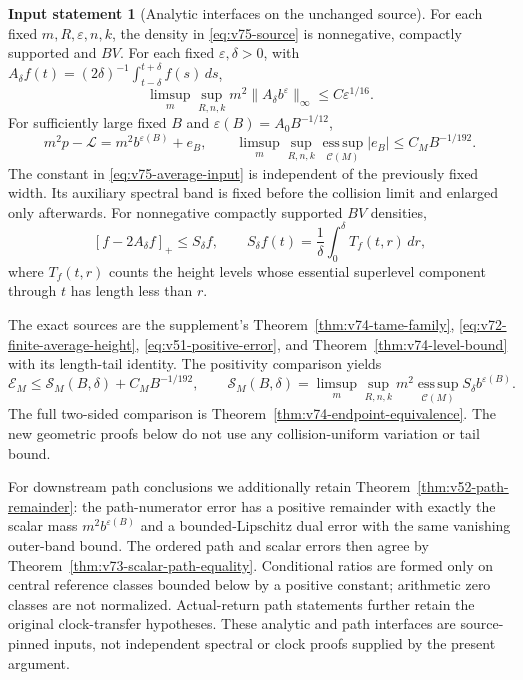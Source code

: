 \documentclass[11pt,reqno]{amsart}
\numberwithin{equation}{section}
\theoremstyle{definition}
\newtheorem{inputstatement}[theorem]{Input statement}
\theoremstyle{remark}\newtheorem{remark}[theorem]{Remark}
\newcommand{\esssup}{\operatorname*{ess\,sup}}
\begin{document}
\begin{inputstatement}[Analytic interfaces on the unchanged source]
\label{input:v75-analytic}
For each fixed $m,R,\varepsilon,n,k$, the density in
\eqref{eq:v75-source} is nonnegative, compactly supported and $BV$.
For each fixed $\varepsilon,\delta>0$, with
$A_\delta f(t)=(2\delta)^{-1}\int_{t-\delta}^{t+\delta}f(s)\,ds$,
\begin{equation}\label{eq:v75-average-input}
 \limsup_m\sup_{R,n,k}m^2\|A_\delta b^\varepsilon\|_\infty
                                  \le C\varepsilon^{1/16}.
\end{equation}
For sufficiently large fixed $B$ and $\varepsilon(B)=A_0B^{-1/12}$,
\begin{equation}\label{eq:v75-positive-input}
 m^2p-\mathcal L=m^2b^{\varepsilon(B)}+e_B,\qquad
 \limsup_m\sup_{R,n,k}\esssup_{\mathcal C(M)}|e_B|
                                  \le C_MB^{-1/192}.
\end{equation}
The constant in \eqref{eq:v75-average-input} is independent of the
previously fixed width. Its auxiliary spectral band is fixed before
the collision limit and enlarged only afterwards. For nonnegative
compactly supported $BV$ densities,
\[
 [f-2A_\delta f]_+\le S_\delta f,\qquad
 S_\delta f(t)=\frac1\delta\int_0^\delta T_f(t,r)\,dr,
\]
where $T_f(t,r)$ counts the height levels whose essential superlevel
component through $t$ has length less than $r$.
\end{inputstatement}

The exact sources are the supplement's
Theorem~\ref{thm:v74-tame-family},
\eqref{eq:v72-finite-average-height},
\eqref{eq:v51-positive-error}, and
Theorem~\ref{thm:v74-level-bound} with its length-tail identity.
The positivity comparison yields
\[
 \mathcal E_M\le\mathcal S_M(B,\delta)+C_MB^{-1/192},\qquad
 \mathcal S_M(B,\delta)=\limsup_m\sup_{R,n,k}m^2
                           \esssup_{\mathcal C(M)}S_\delta b^{\varepsilon(B)}.
\]
The full two-sided comparison is
Theorem~\ref{thm:v74-endpoint-equivalence}. The new geometric
proofs below do not use any collision-uniform variation or tail bound.

For downstream path conclusions we additionally retain
Theorem~\ref{thm:v52-path-remainder}: the path-numerator error has
a positive remainder with exactly the scalar mass $m^2b^{\varepsilon(B)}$
and a bounded-Lipschitz dual error with the same vanishing outer-band
bound. The ordered path and scalar errors then agree by
Theorem~\ref{thm:v73-scalar-path-equality}. Conditional ratios are
formed only on central reference classes bounded below by a positive
constant; arithmetic zero classes are not normalized. Actual-return
path statements further retain the original clock-transfer hypotheses.
These analytic and path interfaces are source-pinned inputs, not
independent spectral or clock proofs supplied by the present argument.
\end{document}
